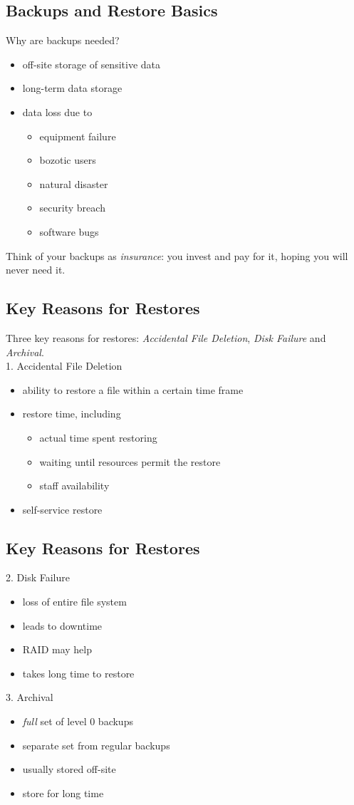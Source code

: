 \documentclass[xga]{xdvislides}
\begin{document}
\subsection{Backups and Restore Basics}
Why are backups needed?
\begin{itemize}
	\item off-site storage of sensitive data
	\item long-term data storage
	\item data loss due to
		\begin{itemize}
			\item equipment failure
			\item bozotic users
			\item natural disaster
			\item security breach
			\item software bugs
		\end{itemize}
\end{itemize}
\addvspace{.5in}
Think of your backups as {\em insurance}:  you invest and pay for it, hoping
you will never need it.


\subsection{Key Reasons for Restores}
Three key reasons for restores: {\em Accidental File Deletion}, {\em Disk
Failure} and {\em Archival}.
\\

1. Accidental File Deletion
\begin{itemize}
	\item ability to restore a file within a certain time frame
	\item restore time, including
		\begin{itemize}
			\item actual time spent restoring
			\item waiting until resources permit the restore
			\item staff availability
		\end{itemize}
	\item self-service restore
\end{itemize}

\subsection{Key Reasons for Restores}
2. Disk Failure
\begin{itemize}
	\item loss of entire file system
	\item leads to downtime
	\item RAID may help
	\item takes long time to restore
\end{itemize}
\addvspace{.5in}
3. Archival
\begin{itemize}
	\item {\em full} set of level 0 backups
	\item separate set from regular backups
	\item usually stored off-site
	\item store for long time
\end{itemize}
\end{document}
